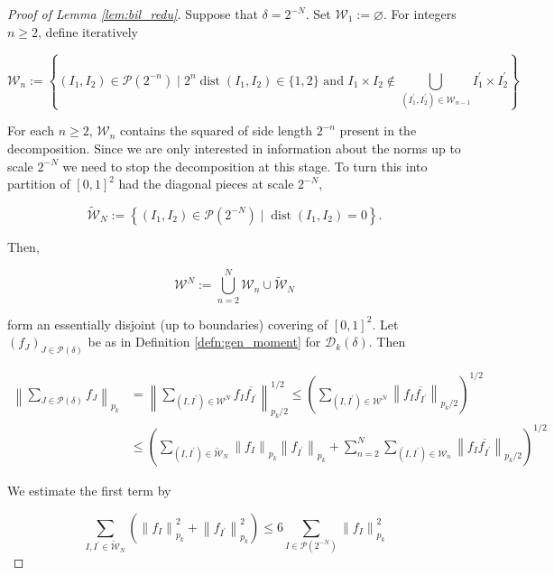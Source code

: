 \begin{proof}[Proof of Lemma \ref{lem:bil_redu}]
Suppose that $\delta=2^{-N}$. Set $\mathcal{W}_{1}:=\varnothing$. For integers $n \geqslant 2$, define iteratively

$$
\mathcal{W}_{n}:=\left\{\left(I_{1}, I_{2}\right) \in \mathcal{P}\left(2^{-n}\right) \mid 2^{n} \operatorname{dist}\left(I_{1}, I_{2}\right) \in\{1,2\} \text { and } I_{1} \times I_{2} \notin \bigcup_{\left(I_{1}^{\prime}, I_{2}^{\prime}\right) \in \mathcal{W}_{n-1}} I_{1}^{\prime} \times I_{2}^{\prime}\right\}
$$

For each $n\geq2$, $\mathcal{W}_n$ contains the squared of side length $2^{-n}$ present in the decomposition. Since we are only interested in information about the norms up to scale $2^{-N}$ we need to stop the decomposition at this stage. To turn this into partition of $[0,1]^2$ had the diagonal pieces at scale $2^{-N}$,


$$
\widetilde{\mathcal{W}}_{N}:=\left\{\left(I_{1}, I_{2}\right) \in \mathcal{P}\left(2^{-N}\right) \mid \operatorname{dist}\left(I_{1}, I_{2}\right)=0\right\}.
$$

Then, 

$$
\mathcal{W}^{N}:=\bigcup_{n=2}^{N} \mathcal{W}_{n} \cup \widetilde{\mathcal{W}}_{N}
$$

form an essentially disjoint (up to boundaries) covering of $[0,1]^{2}$. Let $\left(f_{J}\right)_{J \in \mathcal{P}(\delta)}$ be as in Definition \ref{defn:gen_moment} for $\mathcal{D}_{k}(\delta)$. Then


\begin{align*}
\left\|\sum_{J \in \mathcal{P}(\delta)} f_{J}\right\|_{p_{k}} & =\left\|\sum_{\left(I, I^{\prime}\right) \in \mathcal{W}^{N}} f_{I} \overline{f_{I^{\prime}}}\right\|_{p_{k} / 2}^{1 / 2} \leqslant\left(\sum_{\left(I, I^{\prime}\right) \in \mathcal{W}^{N}}\left\|f_{I} \overline{f_{I^{\prime}}}\right\|_{p_{k} / 2}\right)^{1 / 2} \\
& \leqslant\left(\sum_{\left(I, I^{\prime}\right) \in \widetilde{\mathcal{W}}_{N}}\left\|f_{I}\right\|_{p_{k}}\left\|f_{I^{\prime}}\right\|_{p_{k}}+\sum_{n=2}^{N} \sum_{\left(I, I^{\prime}\right) \in \mathcal{W}_{n}}\left\|f_{I} \overline{f_{I^{\prime}}}\right\|_{p_{k} / 2}\right)^{1 / 2}
\end{align*}

We estimate the first term by

$$
\sum_{I, I^{\prime} \in  \widetilde{\mathcal{W}}_{N}}\left(\left\|f_{I}\right\|_{p_{k}}^{2}+\left\|f_{I^{\prime}}\right\|_{p_{k}}^{2}\right) \leqslant 6 \sum_{I \in \mathcal{P}\left(2^{-N}\right)}\left\|f_{I}\right\|_{p_{k}}^{2}
$$


\end{proof}
